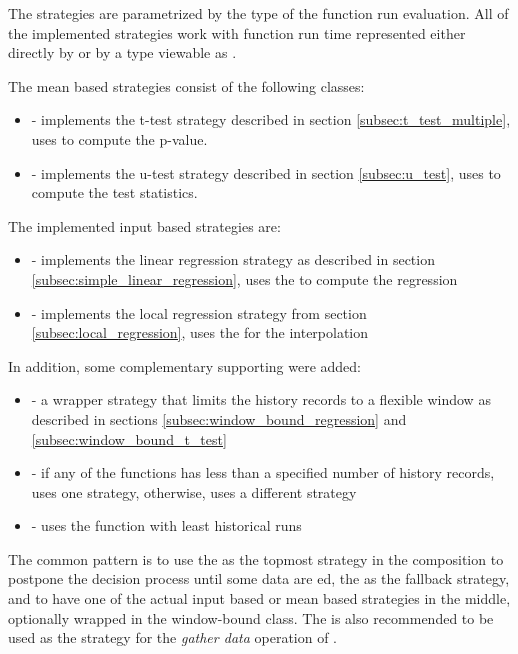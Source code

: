 The strategies are parametrized by the  type of the function run evaluation. All of the implemented strategies work with function run time represented either directly by  or by a type viewable as .

The mean based strategies consist of the following classes:
\begin{itemize}
	\item {} - implements the t-test strategy described in section \ref{subsec:t_test_multiple}, uses \cite{noauthor_apachemath_nodate} to compute the p-value.
	\item {} - implements the u-test strategy described in section \ref{subsec:u_test}, uses \cite{noauthor_apachemath_nodate} to compute the test statistics.
\end{itemize}

The implemented input based strategies are:
\begin{itemize}
	\item {} - implements the linear regression strategy as described in section \ref{subsec:simple_linear_regression}, uses the \cite{noauthor_apachemath_nodate} to compute the regression

	\item {} - implements the local regression strategy from section \ref{subsec:local_regression}, uses the \cite{noauthor_apachemath_nodate} for the interpolation
\end{itemize}

In addition, some complementary supporting were added:
\begin{itemize}
	\item {} - a wrapper strategy that limits the history records to a flexible window as described in sections \ref{subsec:window_bound_regression} and \ref{subsec:window_bound_t_test}
\item {} - if any of the functions has less than a specified number of history records, uses one strategy, otherwise, uses a different strategy
\item {} - uses the function with least historical runs
\end{itemize}

The common pattern is to use the  as the topmost strategy in the composition to postpone the decision process until some data are ed, the  as the fallback strategy, and to have one of the actual input based or mean based strategies in the middle, optionally wrapped in the window-bound class. The  is also recommended to be used as the strategy for the \textit{gather data} operation of .

